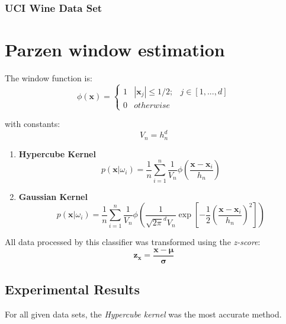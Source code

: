 \documentclass{article}
\numberwithin{figure}{section}
\newcommand{\bx}{\mathbf{x}}
\newcommand{\bm}{\mathbf{\mu}}
\begin{document}
\subsubsection{UCI Wine Data Set}

\section{Parzen window estimation}
The window function is:
$$\phi(\bx) = \left\{\begin{matrix}
1 & |\bx_j| \leq 1/2; & j \in [1,...,d]\\
0 & otherwise &
\end{matrix}\right.$$

with constants:
$$V_n = h_n^d$$

\begin{enumerate}
\item {\bf Hypercube Kernel}
$$p(\bx | \omega_i ) = \frac{1}{n} \sum^n_{i=1} \frac{1}{V_n} \phi \left(\frac{\bx - \bx_i}{h_n}\right)$$

\item {\bf Gaussian Kernel}
$$p(\bx | \omega_i ) = \frac{1}{n} \sum^n_{i=1} \frac{1}{V_n} \phi \left(\frac{1}{\sqrt{2\pi}^d V_n} \exp\left[-\frac{1}{2} \left(\frac{\bx - \bx_i}{h_n}\right)^2\right]\right)$$
\end{enumerate}

All data processed by this classifier was transformed using the \emph{z-score}:
$$\mathbf{z_x} = \frac{\bx - \bm}{\mathbf{\sigma}}$$

\subsection{Experimental Results}
For all given data sets, the \emph{Hypercube kernel} was the most accurate method.
\end{document}
